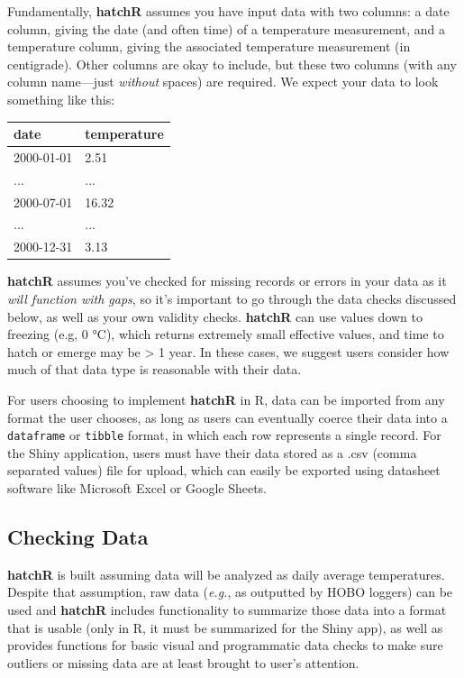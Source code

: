 \documentclass[webpdf,large,contemporary,namedate]{oup-authoring-template}
\theoremstyle{thmstyleone}
\theoremstyle{thmstyletwo}
\theoremstyle{thmstylethree}
\begin{document}
Fundamentally, \textbf{hatchR} assumes you have input data with two
columns: a date column, giving the date (and often time) of a
temperature measurement, and a temperature column, giving the associated
temperature measurement (in centigrade). Other columns are okay to
include, but these two columns (with any column name---just
\emph{without} spaces) are required. We expect your data to look
something like this:

\begin{tabular}{ll}
\toprule
date & temperature\\
\midrule
2000-01-01 & 2.51\\
... & ...\\
2000-07-01 & 16.32\\
... & ...\\
2000-12-31 & 3.13\\
\bottomrule
\end{tabular}

\textbf{hatchR} assumes you've checked for missing records or errors in
your data as it \emph{will function with gaps}, so it's important to go
through the data checks discussed below, as well as your own validity
checks. \textbf{hatchR} can use values down to freezing (e.g, 0 °C),
which returns extremely small effective values, and time to hatch or
emerge may be \textgreater{} 1 year. In these cases, we suggest users
consider how much of that data type is reasonable with their data.

For users choosing to implement \textbf{hatchR} in R, data can be
imported from any format the user chooses, as long as users can
eventually coerce their data into a \texttt{dataframe} or
\texttt{tibble} format, in which each row represents a single record.
For the Shiny application, users must have their data stored as a .csv
(comma separated values) file for upload, which can easily be exported
using datasheet software like Microsoft Excel or Google Sheets.

\subsection{Checking Data}\label{checking-data}

\textbf{hatchR} is built assuming data will be analyzed as daily average
temperatures. Despite that assumption, raw data (\emph{e.g.}, as
outputted by HOBO loggers) can be used and \textbf{hatchR} includes
functionality to summarize those data into a format that is usable (only
in R, it must be summarized for the Shiny app), as well as provides
functions for basic visual and programmatic data checks to make sure
outliers or missing data are at least brought to user's attention.
\end{document}
